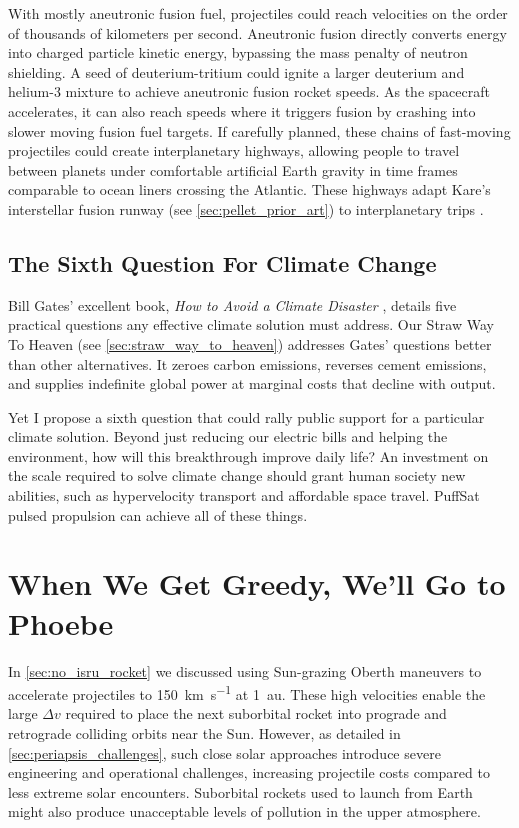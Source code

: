\documentclass{article}
\newcommand{\deltav}{\Delta v}
\begin{document}
With mostly aneutronic fusion fuel, projectiles could reach velocities on the order of thousands of kilometers per second.  Aneutronic fusion directly converts energy into charged particle kinetic energy, bypassing the mass penalty of neutron shielding.  A seed of deuterium-tritium could ignite a larger deuterium and helium-3 mixture to achieve aneutronic fusion rocket speeds.   As the spacecraft accelerates, it can also reach speeds where it triggers fusion by crashing into slower moving fusion fuel targets.   If carefully planned, these chains of fast-moving projectiles could create interplanetary highways, allowing people to travel between planets under comfortable artificial Earth gravity in time frames comparable to ocean liners crossing the Atlantic.  These highways adapt Kare's interstellar fusion runway (see \autoref{sec:pellet_prior_art}) to interplanetary trips \cite{kare1997buzzbomb, greason2020runway}.  

\subsection{The Sixth Question For Climate Change}\label{sec:sith_question}
Bill Gates' excellent book, \textit{How to Avoid a Climate Disaster} \cite{gates2021avoid}, details five practical questions \cite{breakthroughenergy_2021_five} any effective climate solution must address. Our Straw Way To Heaven (see \autoref{sec:straw_way_to_heaven}) addresses Gates' questions better than other alternatives. It zeroes carbon emissions, reverses cement emissions, and supplies indefinite global power at marginal costs that decline with output.

Yet I propose a sixth question that could rally public support for a particular climate solution. Beyond just reducing our electric bills and helping the environment, how will this breakthrough improve daily life? An investment on the scale required to solve climate change should grant human society new abilities, such as hypervelocity transport and affordable space travel. PuffSat pulsed propulsion can achieve all of these things.  

\section{When We Get Greedy, We'll Go to Phoebe}\label{sec:greedy_phoebe}
In \autoref{sec:no_isru_rocket} we discussed using Sun-grazing Oberth maneuvers to accelerate projectiles to \SI{150}{\kilo\meter\per\second} at \SI{1}{\astronomicalunit}. These high velocities enable the large $\deltav$ required to place the next suborbital rocket into prograde and retrograde colliding orbits near the Sun.  However, as detailed in \autoref{sec:periapsis_challenges}, such close solar approaches introduce severe engineering and operational challenges, increasing projectile costs compared to less extreme solar encounters.  Suborbital rockets used to launch from Earth might also produce unacceptable levels of pollution in the upper atmosphere.
\end{document}
